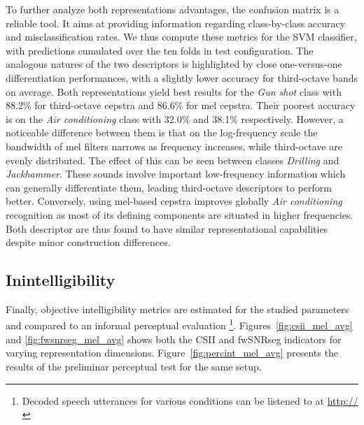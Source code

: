\documentclass[final,3p,times,twocolumn]{elsarticle}
\begin{document}
To further analyze both representations advantages, the confusion matrix is a reliable tool. It aims at providing information regarding class-by-class accuracy and misclassification rates. We thus compute these metrics for the SVM classifier, with predictions cumulated over the ten folds in test configuration. The analogous natures of the two descriptors is highlighted by close one-versus-one differentiation performances, with a slightly lower accuracy for third-octave bands on average. Both representations yield best results for the \textit{Gun shot} class with 88.2\% for third-octave cepstra and 86.6\% for mel cepstra. Their poorest accuracy is on the \textit{Air conditioning} class with 32.0\% and 38.1\% respectively. However, a noticeable difference between them is that on the log-frequency scale the bandwidth of mel filters narrows as frequency increases, while third-octave are evenly distributed. The effect of this can be seen between classes \textit{Drilling} and \textit{Jackhammer}. These sounds involve important low-frequency information which can generally differentiate them, leading third-octave descriptors to perform better. Conversely, using mel-based cepstra improves globally \textit{Air conditioning} recognition as most of its defining components are situated in higher frequencies.\\

Both descriptor are thus found to have similar representational capabilities despite minor construction differences.


\subsection{Inintelligibility}


Finally, objective intelligibility metrics are estimated for the studied parameters and compared to an informal perceptual evaluation \footnote{Decoded speech utterances for various conditions can be listened to at \url{http://}}. Figures~\ref{fig:csii_mel_avg} and \ref{fig:fwsnrseg_mel_avg} shows both the CSII and fwSNRseg indicators for varying representation dimensions. Figure~\ref{fig:percint_mel_avg} presents the results of the preliminar perceptual test for the same setup. %
\end{document}
